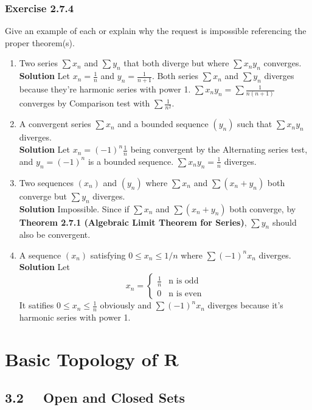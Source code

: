 \documentclass[12pt]{report}
\begin{document}
\subsection*{Exercise 2.7.4}
Give an example of each or explain why the request is impossible
referencing the proper theorem(s).\
\begin{enumerate}[label=(\alph*)]
    \item Two series $\sum x_n$ and $\sum y_n$ that both diverge but where $\sum x_ny_n$ converges.\\
    \textbf{Solution} Let $x_n = \frac{1}{n}$ and $y_n=\frac{1}{n+1}$. Both series $\sum x_n$ and $\sum y_n$ 
    diverges because they're harmonic series with power 1. $\sum x_n y_n = \sum \frac{1}{n(n+1)}$ converges by 
    Comparison test with $\sum \frac{1}{n^2}$.
    \item A convergent series $\sum x_n$ and a bounded sequence $(y_n)$ such that $\sum x_ny_n$ diverges.\\
    \textbf{Solution} Let $x_n = (-1)^n \frac{1}{n}$ being convergent by the Alternating series test, and $y_n = (-1)^n$ is a bounded sequence. 
    $\sum x_n y_n = \frac{1}{n}$ diverges.
    \item Two sequences $(x_n)$ and $(y_n)$ where $\sum x_n$ and $\sum (x_n+y_n)$ both converge but $\sum y_n$ diverges.\\
    \textbf{Solution} Impossible. Since if $\sum x_n$ and $\sum (x_n+y_n)$ both converge, by \textbf{Theorem 2.7.1 (Algebraic Limit Theorem for Series)}, 
    $\sum y_n$ should also be convergent.
    \item A sequence $(x_n)$ satisfying $0 \leq x_n \leq 1/n$ where $\sum(-1)^n x_n$ diverges.\\
    \textbf{Solution} Let $$x_n=
    \begin{cases}
        \frac{1}{n} & \text{n is odd}\\
        0 & \text{n is even}
    \end{cases}$$
    It satifies $0 \leq x_n \leq \frac{1}{n}$ obviously and $\sum(-1)^n x_n$ diverges because it's harmonic series with power 1.
\end{enumerate}

\chapter{Basic Topology of $\mathbf{R}$}
\section{3.2 ~~Open and Closed Sets}
\end{document}

